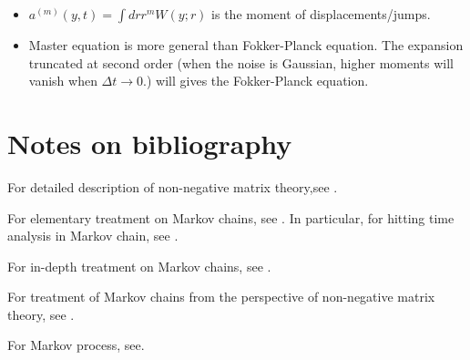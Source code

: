 \begin{refsection}
\begin{remark}[interpretation]\hfill
\begin{itemize}
	\item $a^{(m)}(y,t) = \int dr r^m W(y;r)$ is the moment of displacements/jumps.
	\item Master equation is more general than Fokker-Planck equation. The expansion truncated at second order (when the noise is Gaussian, higher moments will vanish when $\Delta t\to 0$.) will gives the Fokker-Planck equation.
\end{itemize}
\end{remark}


\section{Notes on bibliography}
For detailed description of non-negative matrix theory,see \cite{meyer2000matrix}\cite{cinlar2013introduction}.

For elementary treatment on Markov chains, see \cite{privault2013understanding}\cite{Holmes-Cerfon2015applied}\cite{luenberger1979introduction}. In particular, for hitting time analysis in Markov chain, see \cite{privault2013understanding}.

For in-depth treatment on Markov chains, see \cite{gallager2013stochastic}\cite{sericola2013markov}\cite{He2007stochastic}.

For treatment of Markov chains from the perspective of non-negative matrix theory, see \cite{seneta2006non}.

For Markov process, see\cite{pavliotis2014stochastic}.



\printbibliography
\end{refsection}
